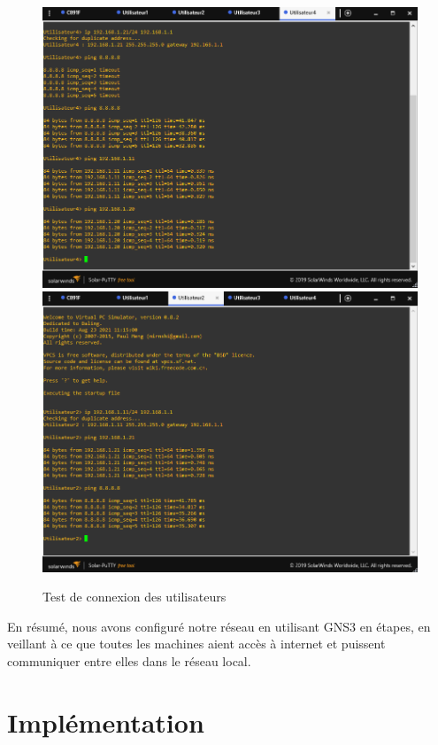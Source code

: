 \begin{figure}[H]
 \centering
    \includegraphics[width=15.5cm]{Images/BRades-Topologie8.png}
    \includegraphics[width=15.5cm]{Images/BRades-Topologie9.png}
    \caption{Test de connexion des utilisateurs}
    \label{Chap2.2.7}
\end{figure}


En résumé, nous avons configuré notre réseau en utilisant GNS3 en étapes, en veillant à ce que toutes les machines aient accès à internet et puissent communiquer entre elles dans le réseau local.


  
\section{Implémentation}

